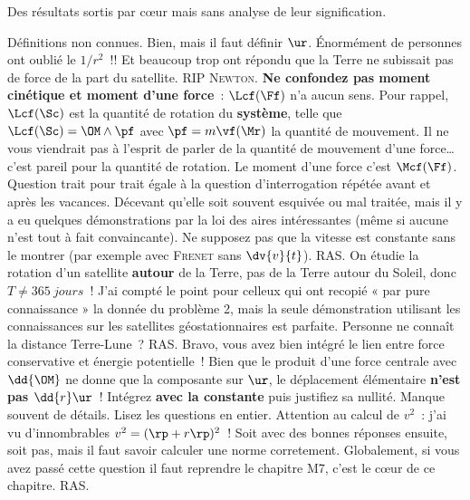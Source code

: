 \documentclass[a4paper, 10pt, final, garamond]{book}
\begin{document}
Des résultats sortis par cœur mais sans analyse de leur signification.
\begin{enumerate}
	Définitions non connues.
	Bien, mais il faut définir $\ur$. Énormément de personnes ont oublié le
	$1/r^{\boxed{2}}$~!! Et beaucoup trop ont répondu que la Terre ne subissait
	pas de force de la part du satellite. RIP \textsc{Newton}.
	\textbf{Ne confondez pas moment cinétique et moment d'une force}~: $\Lcf(\Ff)$
	n'a aucun sens. Pour rappel, $\Lcf(\Sc)$ est la quantité de rotation du
	\textbf{système}, telle que $\Lcf(\Sc) = \OM \wedge \pf$ avec $\pf =
		m\vf(\Mr)$ la quantité de mouvement. Il ne vous viendrait pas à l'esprit de
	parler de la quantité de mouvement d'une force… c'est pareil pour la quantité
	de rotation. Le moment d'une force c'est $\Mcf(\Ff)$.
	\smallbreak
	Question trait pour trait égale à la question d'interrogation répétée avant et
	après les vacances. Décevant qu'elle soit souvent esquivée ou mal traitée,
	mais il y a eu quelques démonstrations par la loi des aires intéressantes
	(même si aucune n'est tout à fait convaincante).
	Ne supposez pas que la vitesse est constante sans le montrer (par exemple avec
	\textsc{Frenet} sans $\dv{v}{t}$).
	RAS.
	On étudie la rotation d'un satellite \textbf{autour} de la Terre, pas de la
	Terre autour du Soleil, donc $T \neq \SI{365}{jours}$~! J'ai compté le point
	pour celleux qui ont recopié « par pure connaissance » la donnée du problème
	2, mais la seule démonstration utilisant les connaissances sur les satellites
	géostationnaires est parfaite. Personne ne connaît la distance Terre-Lune~?
	RAS.
	Bravo, vous avez bien intégré le lien entre force conservative et énergie
	potentielle~!
	\smallbreak
	Bien que le produit d'une force centrale avec $\dd{\OM}$ ne donne que la
	composante sur $\ur$, le déplacement élémentaire \textbf{n'est pas
		$\dd{r}\ur$}~!
	\smallbreak
	Intégrez \textbf{avec la constante} puis justifiez sa nullité.
	Manque souvent de détails. Lisez les questions en entier. Attention au calcul
	de $v^2$~: j'ai vu d'innombrables $v^2 = (\rp + r\rp)^2$~! Soit avec des
	bonnes réponses ensuite, soit pas, mais il faut savoir calculer une norme
	corretement.
	\smallbreak
	Globalement, si vous avez passé cette question il faut reprendre le chapitre
	M7, c'est le cœur de ce chapitre.
	RAS.
\end{enumerate}
\end{document}
